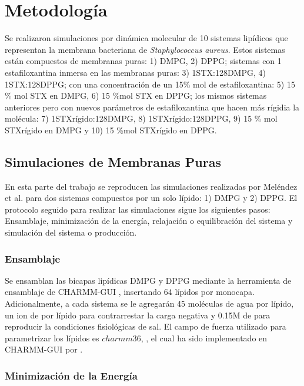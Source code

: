 \chapter{Metodolog\'{i}a}

Se realizaron simulaciones por din\'{a}mica molecular de 10 sistemas lip\'{i}dicos que representan la membrana bacteriana de \textit{Staphylococcus aureus}. Estos sistemas est\'{a}n compuestos de membranas puras: 1) DMPG, 2) DPPG; sistemas con 1 estafiloxantina inmersa en las membranas puras:  3) 1STX:128DMPG,  4) 1STX:128DPPG; con una concentraci\'{o}n de un 15\% mol de estafiloxantina:  5) 15 \%  mol STX  en  DMPG, 6) 15 \%mol STX en DPPG; los mismos sistemas anteriores pero con nuevos par\'{a}metros de estafiloxantina que hacen m\'{a}s r\'{i}gidia la mol\'{e}cula: 7) 1STXr\'{i}gido:128DMPG,  8) 1STXr\'{i}gido:128DPPG,  9) 15 \%  mol STXr\'{i}gido  en  DMPG y 10) 15 \%mol STXr\'{i}gido en DPPG. 
\section{Simulaciones de Membranas Puras} \label{sec:mem-pure}
En esta parte del trabajo se reproducen las simulaciones realizadas por Mel\'{e}ndez et al. \cite{Melendez-Delgado2018StudyingBilayers} para  dos sistemas compuestos por un solo l\'{i}pido: 1) DMPG y 2) DPPG. El protocolo seguido para realizar las simulaciones sigue los siguientes pasos: Ensamblaje, minimizaci\'{o}n de la energ\'{i}a, relajaci\'{o}n o equilibraci\'{o}n del sistema y simulaci\'{o}n del sistema o producci\'{o}n. \\


\subsection*{Ensamblaje}

Se ensamblan las bicapas lip\'{i}dicas DMPG y DPPG mediante la herramienta de ensamblaje de CHARMM-GUI \cite{Brooks2009}, insertando 64 l\'{i}pidos por monocapa. Adicionalmente, a cada sistema se le agregar\'{a}n 45 mol\'{e}culas de agua por l\'{i}pido,  un ion de  por l\'{i}pido  para contrarrestar la carga negativa y 0.15M de  para reproducir la condiciones fisiol\'{o}gicas de sal. El campo de fuerza utilizado para parametrizar los l\'{i}pidos es $charmm36$, \cite{Huang2013CHARMM36Data}, el cual ha sido implementado en CHARMM-GUI por \cite{Lee2016CHARMM-GUIField}.\\

\subsection*{Minimizaci\'{o}n de la Energ\'{i}a}

